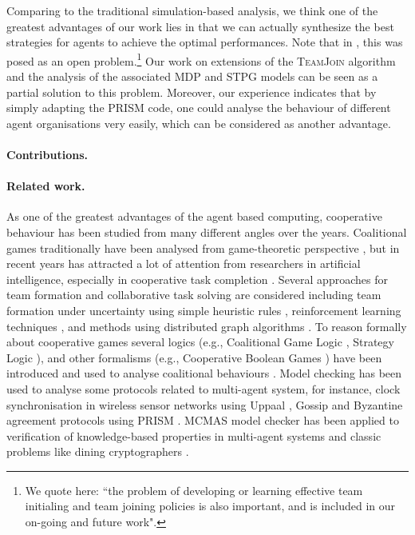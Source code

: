 \documentclass{llncs}
\newcommand{\dave}[1]{\marginpar{\footnotesize \color{red} {\bf D:} \textsf{#1}}}
\newcommand{\comment}[1]{\marginpar{\footnotesize \color{red} \textsf{#1}}}
\begin{document}
%

Comparing to the traditional simulation-based analysis, we think one of the greatest advantages of our work lies in that we can actually synthesize the best strategies for agents to achieve the optimal performances. Note that in \cite{gaston2005agent}, this was posed as an open problem.\footnote{We quote here: ``the problem of developing or learning effective team initialing and team joining policies is also important, and is included in our on-going and future work".} Our work on extensions of the \textsc{TeamJoin} algorithm and the analysis of the associated MDP and STPG models can be seen as a partial solution to this problem. Moreover, our experience indicates that by simply adapting the PRISM code, one could analyse the behaviour of different agent organisations very easily, which can be considered as another advantage.

\paragraph{Contributions.}
\dave{could itemise contributions here}

\paragraph{Related work.}
As one of the greatest advantages of the agent based computing, cooperative behaviour has been studied from many different angles over the years. Coalitional games traditionally have been analysed from game-theoretic perspective \cite{osborne1994course}, but in recent years has attracted a lot of attention from researchers in artificial intelligence, especially in cooperative task completion \cite{shehory1998methods}. Several approaches for team formation and collaborative task solving are considered including team formation under uncertainty using simple heuristic rules \cite{kraus2003coalition}, reinforcement learning techniques \cite{abdallah2004organization}, and methods using distributed graph algorithms \cite{manisterski2006forming}. To reason formally about cooperative games several logics (e.g., Coalitional Game Logic \cite{agotnes2009reasoning}, Strategy Logic \cite{chatterjee2007strategy}), and other formalisms (e.g., Cooperative Boolean Games \cite{dunne2008cooperative}) have been introduced and used to analyse coalitional behaviours \cite{bonzon2007efficient}. Model checking has been used to analyse some protocols related to multi-agent system, for instance, clock synchronisation in wireless sensor networks using Uppaal \cite{heidarian2009analysis}, Gossip \cite{KNP08d} and Byzantine agreement protocols \cite{KN02} using PRISM \cite{KNP11}. MCMAS model checker has been applied to verification of knowledge-based properties in multi-agent systems and classic problems like dining cryptographers \cite{lomuscio2006mcmas}.
\end{document}
